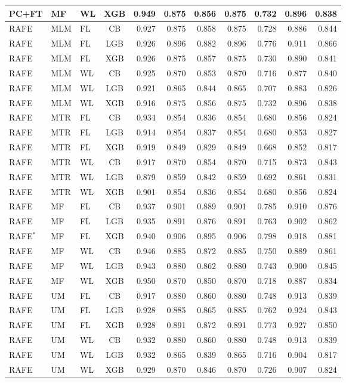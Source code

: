 \documentclass[9pt,a4paper]{article}
\begin{document}
\begin{scriptsize}
\begin{longtable}{lllcrrrrrrr}
PC+FT & MF  & WL & XGB & 0.949 & 0.875 & 0.856 & 0.875 & 0.732 & 0.896 & 0.838 \\
\midrule
RAFE & MLM & FL & CB  & 0.927 & 0.875 & 0.858 & 0.875 & 0.728 & 0.886 & 0.844 \\
RAFE & MLM & FL & LGB & 0.926 & 0.896 & 0.882 & 0.896 & 0.776 & 0.911 & 0.866 \\
RAFE & MLM & FL & XGB & 0.926 & 0.875 & 0.857 & 0.875 & 0.730 & 0.890 & 0.841 \\
RAFE & MLM & WL & CB  & 0.925 & 0.870 & 0.853 & 0.870 & 0.716 & 0.877 & 0.840 \\
RAFE & MLM & WL & LGB & 0.921 & 0.865 & 0.844 & 0.865 & 0.707 & 0.883 & 0.826 \\
RAFE & MLM & WL & XGB & 0.916 & 0.875 & 0.856 & 0.875 & 0.732 & 0.896 & 0.838 \\
RAFE & MTR & FL & CB  & 0.934 & 0.854 & 0.836 & 0.854 & 0.680 & 0.856 & 0.824 \\
RAFE & MTR & FL & LGB & 0.914 & 0.854 & 0.837 & 0.854 & 0.680 & 0.853 & 0.827 \\
RAFE & MTR & FL & XGB & 0.919 & 0.849 & 0.829 & 0.849 & 0.668 & 0.852 & 0.817 \\
RAFE & MTR & WL & CB  & 0.917 & 0.870 & 0.854 & 0.870 & 0.715 & 0.873 & 0.843 \\
RAFE & MTR & WL & LGB & 0.879 & 0.859 & 0.842 & 0.859 & 0.692 & 0.861 & 0.831 \\
RAFE & MTR & WL & XGB & 0.901 & 0.854 & 0.836 & 0.854 & 0.680 & 0.856 & 0.824 \\
RAFE & MF  & FL & CB  & 0.937 & 0.901 & 0.889 & 0.901 & 0.785 & 0.910 & 0.876 \\
RAFE & MF  & FL & LGB & 0.935 & 0.891 & 0.876 & 0.891 & 0.763 & 0.902 & 0.862 \\
RAFE$^*$ & MF & FL & XGB & 0.940 & 0.906 & 0.895 & 0.906 & 0.798 & 0.918 & 0.881 \\
RAFE & MF  & WL & CB  & 0.946 & 0.885 & 0.872 & 0.885 & 0.750 & 0.889 & 0.861 \\
RAFE & MF  & WL & LGB & 0.943 & 0.880 & 0.862 & 0.880 & 0.743 & 0.900 & 0.845 \\
RAFE & MF  & WL & XGB & 0.950 & 0.870 & 0.850 & 0.870 & 0.718 & 0.887 & 0.834 \\
RAFE & UM  & FL & CB  & 0.917 & 0.880 & 0.860 & 0.880 & 0.748 & 0.913 & 0.839 \\
RAFE & UM  & FL & LGB & 0.928 & 0.885 & 0.865 & 0.885 & 0.762 & 0.924 & 0.843 \\
RAFE & UM  & FL & XGB & 0.928 & 0.891 & 0.872 & 0.891 & 0.773 & 0.927 & 0.850 \\
RAFE & UM  & WL & CB  & 0.932 & 0.880 & 0.860 & 0.880 & 0.748 & 0.913 & 0.839 \\
RAFE & UM  & WL & LGB & 0.932 & 0.865 & 0.839 & 0.865 & 0.716 & 0.904 & 0.817 \\
RAFE & UM  & WL & XGB & 0.929 & 0.870 & 0.846 & 0.870 & 0.726 & 0.907 & 0.824 \\
\end{longtable}
\end{scriptsize}
\end{document}

